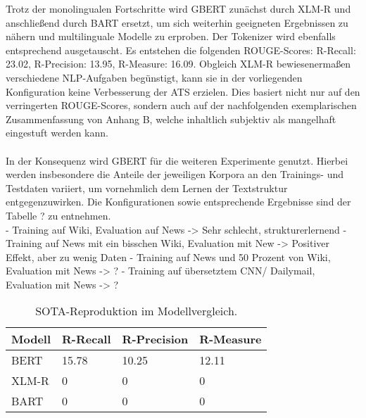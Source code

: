 \noindent
Trotz der monolingualen Fortschritte wird \ac{GBERT} zunächst durch \ac{XLM-R} und anschließend durch \ac{BART} ersetzt, um sich weiterhin geeigneten Ergebnissen zu nähern und multilinguale Modelle zu erproben. Der Tokenizer wird ebenfalls entsprechend ausgetauscht. Es entstehen die folgenden \ac{ROUGE}-Scores: R-Recall: 23.02, R-Precision: 13.95, R-Measure: 16.09. Obgleich \ac{XLM-R} bewiesenermaßen verschiedene \ac{NLP}-Aufgaben begünstigt, kann sie in der vorliegenden Konfiguration keine Verbesserung der \ac{ATS} erzielen. Dies basiert nicht nur auf den verringerten \ac{ROUGE}-Scores, sondern auch auf der nachfolgenden exemplarischen Zusammenfassung von Anhang B, welche inhaltlich subjektiv als mangelhaft eingestuft werden kann.\\

\noindent{}\\


\noindent
In der Konsequenz wird \ac{GBERT} für die weiteren Experimente genutzt. Hierbei werden insbesondere die Anteile der jeweiligen Korpora an den Trainings- und Testdaten variiert, um vornehmlich dem Lernen der Textstruktur entgegenzuwirken. Die Konfigurationen sowie entsprechende Ergebnisse sind der Tabelle ? zu entnehmen.\\


\noindent
- Training auf Wiki, Evaluation auf News
  -> Sehr schlecht, strukturerlernend
- Training auf News mit ein bisschen Wiki, Evaluation mit New
   -> Positiver Effekt, aber zu wenig Daten
- Training auf News und 50 Prozent von Wiki, Evaluation mit News
  -> ?
- Training auf übersetztem CNN/ Dailymail, Evaluation mit News
  -> ?
  
\begin{table}[htb]
\centering
\begin{tabular}{ | p{2.5cm} | p{2.5cm} | p{2.5cm} | p{2.5cm} | }
\hline
\textbf{Modell} & \textbf{R-Recall} & \textbf{R-Precision} & \textbf{R-Measure} \\
\hline
BERT & 15.78 & 10.25 & 12.11 \\
\hline
XLM-R & 0 & 0 & 0 \\
\hline
BART & 0 & 0 & 0 \\
\hline
\end{tabular}
\caption{SOTA-Reproduktion im Modellvergleich.}
\label{table:SotaRougeScores}
\end{table}

